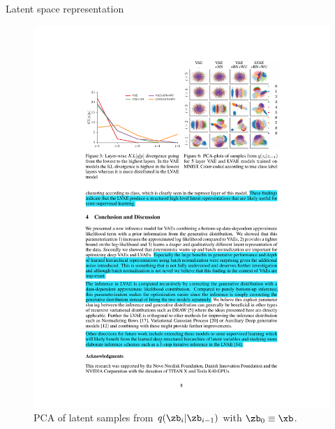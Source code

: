 \begin{frame}{Latent space representation}
    \begin{figure}[\textwidth]
        \centering
        \includegraphics[scale=1]{figures/ladder_vae_pca.pdf}
        \caption{PCA of latent samples from $q(\zb_i|\zb_{i-1})$ with $\zb_0\equiv \xb$.}
    \end{figure}
\end{frame}


